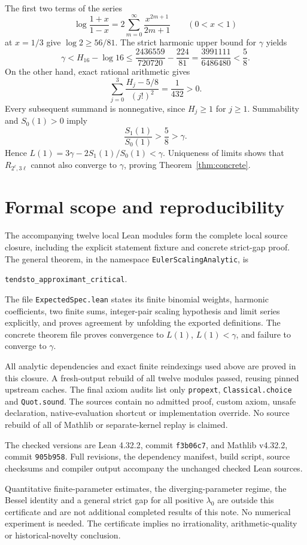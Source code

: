 \documentclass[11pt]{article}
\begin{document}
The first two terms of the series
\[
\log\frac{1+x}{1-x}=2\sum_{m=0}^\infty\frac{x^{2m+1}}{2m+1}
\qquad(0<x<1)
\]
at $x=1/3$ give $\log2\ge56/81$. The strict harmonic upper bound for $\gamma$ yields
\[
\gamma<H_{16}-\log16
\le\frac{2436559}{720720}-\frac{224}{81}
=\frac{3991111}{6486480}<\frac58.
\]
On the other hand, exact rational arithmetic gives
\[
\sum_{j=0}^{3}\frac{H_j-5/8}{(j!)^2}=\frac1{432}>0.
\]
Every subsequent summand is nonnegative, since $H_j\ge1$ for $j\ge1$. Summability and $S_0(1)>0$ imply
\[
\frac{S_1(1)}{S_0(1)}>\frac58>\gamma.
\]
Hence $L(1)=3\gamma-2S_1(1)/S_0(1)<\gamma$. Uniqueness of limits shows that $R_{2^\ell,3\ell}$ cannot also converge to $\gamma$, proving Theorem~\ref{thm:concrete}.

\section{Formal scope and reproducibility}
The accompanying twelve local Lean modules form the complete local source closure, including the explicit statement fixture and concrete strict-gap proof. The general theorem, in the namespace \texttt{EulerScalingAnalytic}, is
\begin{center}
\texttt{tendsto\_approximant\_critical}.
\end{center}
The file \texttt{ExpectedSpec.lean} states its finite binomial weights, harmonic coefficients, two finite sums, integer-pair scaling hypothesis and limit series explicitly, and proves agreement by unfolding the exported definitions. The concrete theorem file proves convergence to $L(1)$, $L(1)<\gamma$, and failure to converge to $\gamma$.

All analytic dependencies and exact finite reindexings used above are proved in this closure. A fresh-output rebuild of all twelve modules passed, reusing pinned upstream caches. The final axiom audits list only \texttt{propext}, \texttt{Classical.choice} and \texttt{Quot.sound}. The sources contain no admitted proof, custom axiom, unsafe declaration, native-evaluation shortcut or implementation override. No source rebuild of all of Mathlib or separate-kernel replay is claimed.

The checked versions are Lean 4.32.2, commit \texttt{f3b06c7}, and Mathlib v4.32.2, commit \texttt{905b958}. Full revisions, the dependency manifest, build script, source checksums and compiler output accompany the unchanged checked Lean sources.

Quantitative finite-parameter estimates, the diverging-parameter regime, the Bessel identity and a general strict gap for all positive $\lambda_0$ are outside this certificate and are not additional completed results of this note. No numerical experiment is needed. The certificate implies no irrationality, arithmetic-quality or historical-novelty conclusion.
\end{document}
